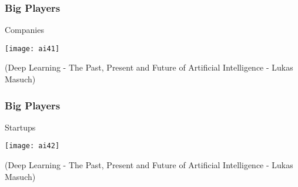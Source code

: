 \begin{frame}[fragile]\frametitle{Big Players}
Companies
\begin{center}
\texttt{[image: ai41]}
\end{center}
{\tiny (Deep Learning - The Past, Present and Future of Artificial Intelligence - Lukas Masuch)}
\end{frame}

\begin{frame}[fragile]\frametitle{Big Players}
Startups
\begin{center}
\texttt{[image: ai42]}
\end{center}
{\tiny (Deep Learning - The Past, Present and Future of Artificial Intelligence - Lukas Masuch)}
\end{frame}
